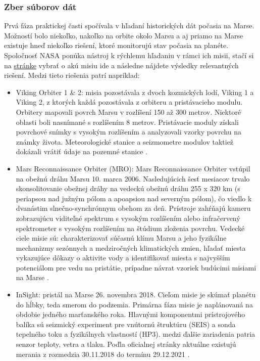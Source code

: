 \subsubsection{Zber súborov dát}
Prvá fáza praktickej časti spočívala v hľadaní historických dát počasia na Marse. Možností bolo niekoľko, nakoľko na orbite okolo Marsu a aj priamo na Marse existuje hneď niekoľko riešení, ktoré monitorujú stav počasia na planéte. Spoločnosť NASA ponúka nástroj k rýchlemu hľadaniu v rámci ich misii, stačí si na  \href{https://pds.nasa.gov/datasearch/data-search/}{stránke} vybrať o akú misiu ide a následne nájdete výsledky relevantných riešení. Medzi tieto riešenia patrí napríklad:
\begin{itemize}
    \item Viking Orbiter 1 \& 2: misia pozostávala z dvoch kozmických lodí, Viking 1 a Viking 2, z ktorých každá pozostávala z orbiteru a pristávacieho modulu. Orbitery mapovali povrch Marsu v rozlíšení 150 až 300 metrov. Niektoré oblasti boli nasnímané s rozlíšením 8 metrov. Pristávacie moduly získali povrchové snímky s vysokým rozlíšením a analyzovali vzorky povrchu na známky života. Meteorologické stanice a seizmometre modulov taktiež dokázali vrátiť údaje na pozemné stanice \cite{viking}.
    \item Mars Reconnaissance Orbiter (MRO): Mars Reconnaissance Orbiter vstúpil na obežnú dráhu Marsu 10. marca 2006. Nasledujúcich šesť mesiacov trvalo skonsolitovanie obežnej dráhy na vedeckú obežnú dráhu 255 x 320 km (s periapsou nad južným pólom a apoapsiou nad severným pólom), čo viedlo k dvanástim slnečno-synchrónnym obehom za deň. Prístroje zahŕňajú kameru zobrazujúcu viditeľné spektrum s vysokým rozlíšením alebo infračervený spektrometer s vysokým rozlíšením na štúdium zloženia povrchu. Vedecké ciele misie sú: charakterizovať súčasnú klímu Marsu a jeho fyzikálne mechanizmy sezónnych a medziročných klimatických zmien, hľadať miesta vykazujúce dôkazy o aktivite vody a identifikovať miesta s najvyšším potenciálom pre vedu na pristátie, prípadne návrat vzoriek budúcimi misiami na Marse \cite{mro}.
    \item InSight: pristál na Marse 26. novembra 2018. Cieľom misie je skúmať planétu do hĺbky, teda smerom do podzemia. Primárna fáza misie je naplánovaná na obdobie jedného marťanského roka. Hlavnými komponentmi prístrojového balíka sú seizmický experiment pre vnútornú štruktúru (SEIS) a sonda tepelného toku a fyzikálnych vlastností (HP3). medzi ďalšie zariadenia patria senzor teploty, vetra a tlaku. Poďla oficialnej stránky aktuálne existujú merania z rozmedzia 30.11.2018 do termínu 29.12.2021 \cite{insight}.

\end{itemize}
